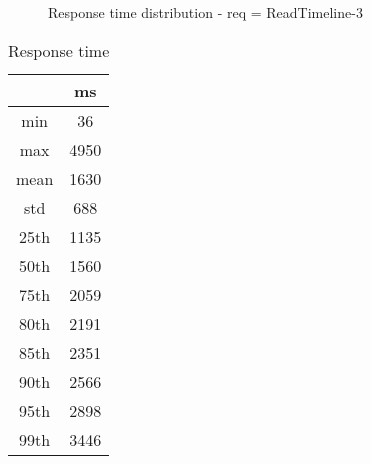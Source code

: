 \begin{minipage}{0.75\linewidth}
\begin{figure}[h]
\begin{adjustbox}{max width=1.0\linewidth, keepaspectratio}
  \end{adjustbox}
  \caption{Response time distribution - req = ReadTimeline-3}
\end{figure}
\end{minipage}\hfill\begin{minipage}{0.18\linewidth}
\begin{table}[h]
\begin{tabular}{|cc|}
\hline
\textbf{} & \textbf{ms}\\ \hline
 \Xhline{0.005\arrayrulewidth}
min & 36\\
 \Xhline{0.005\arrayrulewidth}
max & 4950\\
 \Xhline{0.005\arrayrulewidth}
mean & 1630\\
 \Xhline{0.005\arrayrulewidth}
std & 688\\
\hline
\hline
 \Xhline{0.005\arrayrulewidth}
25th & 1135\\
 \Xhline{0.005\arrayrulewidth}
50th & 1560\\
 \Xhline{0.005\arrayrulewidth}
75th & 2059\\
 \Xhline{0.005\arrayrulewidth}
80th & 2191\\
 \Xhline{0.005\arrayrulewidth}
85th & 2351\\
 \Xhline{0.005\arrayrulewidth}
90th & 2566\\
 \Xhline{0.005\arrayrulewidth}
95th & 2898\\
 \Xhline{0.005\arrayrulewidth}
99th & 3446\\
\hline
\end{tabular}
\caption{Response time}
\end{table}
\end{minipage}\hfill